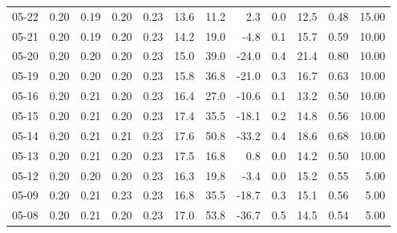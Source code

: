 \begin{threeparttable}
{\begin{tabular}{lrrrrrrrrrrr}
  05-22 &          0.20 &          0.19 &          0.20 &        0.23 &                13.6 &                11.2 &        2.3 &                 0.0 &             12.5 &            0.48 &                  15.00 \\
  05-21 &          0.20 &          0.19 &          0.20 &        0.23 &                14.2 &                19.0 &       -4.8 &                 0.1 &             15.7 &            0.59 &                  10.00 \\
  05-20 &          0.20 &          0.20 &          0.20 &        0.23 &                15.0 &                39.0 &      -24.0 &                 0.4 &             21.4 &            0.80 &                  10.00 \\
  05-19 &          0.20 &          0.20 &          0.20 &        0.23 &                15.8 &                36.8 &      -21.0 &                 0.3 &             16.7 &            0.63 &                  10.00 \\
  05-16 &          0.20 &          0.21 &          0.20 &        0.23 &                16.4 &                27.0 &      -10.6 &                 0.1 &             13.2 &            0.50 &                  10.00 \\
  05-15 &          0.20 &          0.21 &          0.20 &        0.23 &                17.4 &                35.5 &      -18.1 &                 0.2 &             14.8 &            0.56 &                  10.00 \\
  05-14 &          0.20 &          0.21 &          0.21 &        0.23 &                17.6 &                50.8 &      -33.2 &                 0.4 &             18.6 &            0.68 &                  10.00 \\
  05-13 &          0.20 &          0.21 &          0.20 &        0.23 &                17.5 &                16.8 &        0.8 &                 0.0 &             14.2 &            0.50 &                  10.00 \\
  05-12 &          0.20 &          0.20 &          0.20 &        0.23 &                16.3 &                19.8 &       -3.4 &                 0.0 &             15.2 &            0.55 &                   5.00 \\
  05-09 &          0.20 &          0.21 &          0.23 &        0.23 &                16.8 &                35.5 &      -18.7 &                 0.3 &             15.1 &            0.56 &                   5.00 \\
  05-08 &          0.20 &          0.21 &          0.20 &        0.23 &                17.0 &                53.8 &      -36.7 &                 0.5 &             14.5 &            0.54 &                   5.00 \\

\end{tabular}}
\end{threeparttable}
